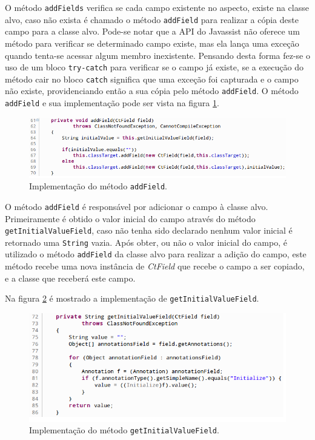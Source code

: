 \documentclass[tc,oneside]{iiufrgs}
\begin{document}
O método \texttt{addFields} verifica se cada campo existente no aspecto, existe na classe alvo, caso não exista é chamado o método \texttt{addField} para realizar a cópia deste campo para a classe alvo. Pode-se notar que a API do Javassist não oferece um método para verificar se determinado campo existe, mas ela lança uma exceção quando tenta-se acessar algum membro inexistente. Pensando desta forma fez-se o uso de um bloco \texttt{try-catch} para verificar se o campo já existe, se a execução do método cair no bloco \texttt{catch} significa que uma exceção foi capturada e o campo não existe, providenciando então a sua cópia pelo método \texttt{addField}. O método \texttt{addField} e sua implementação pode ser vista na figura \ref{fig:addfield}.

\begin{figure}[ht]
	\centering
	\includegraphics[scale=0.5]{figuras/implementacao/addfield.png}
	\caption{Implementação do método \texttt{addField}.}
	\label{fig:addfield}
\end{figure}

O método \texttt{addField} é responsável por adicionar o campo à classe alvo. Primeiramente é obtido o valor inicial do campo através do método \texttt{getInitialValueField}, caso não tenha sido declarado nenhum valor inicial é retornado uma \texttt{String} vazia. Após obter, ou não o valor inicial do campo, é utilizado o método \texttt{addField} da classe alvo para realizar a adição do campo, este método recebe uma nova instância de \textit{CtField} que recebe o campo a ser copiado, e a classe que receberá este campo.

Na figura \ref{fig:getinitialvaluefield} é mostrado a implementação de \texttt{getInitialValueField}.

\begin{figure}[ht]
	\centering
	\includegraphics[scale=0.6]{figuras/implementacao/getinitialvaluefield.png}
	\caption{Implementação do método \texttt{getInitialValueField}.}
	\label{fig:getinitialvaluefield}
\end{figure}
\end{document}
